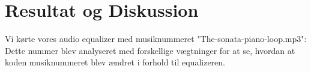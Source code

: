 \chapter{Resultat og Diskussion}\label{ch:Resultat og Diskussion}

Vi kørte vores audio equalizer med musiknummeret "The-sonata-piano-loop.mp3":
Dette nummer blev analyseret med forskellige vægtninger for at se, hvordan at koden musiknummeret blev ændret i forhold til equalizeren.
